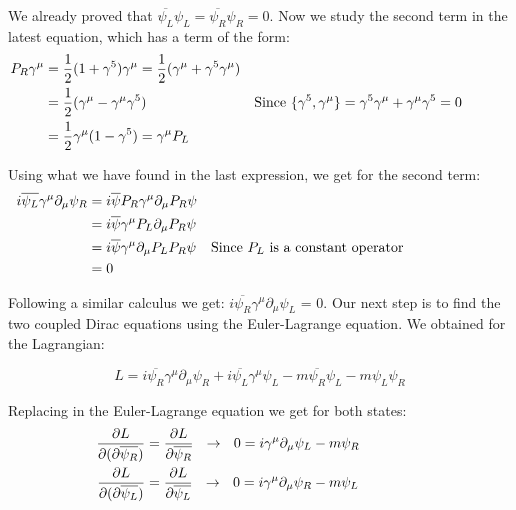 We already proved that $\overline{\psi_L}\psi_L = \overline{\psi_R}\psi_R = 0$. Now we study the second term in the latest equation, which has a term of the form:
\begin{align}
  &\begin{aligned}
     \mathllap{P_R\gamma^\mu}  &= \frac{1}{2} (1 + \gamma^5)\gamma^\mu = \frac{1}{2} (\gamma^\mu + \gamma^5 \gamma^\mu) \\        
     \mathllap{}            &= \frac{1}{2} (\gamma^\mu - \gamma^\mu \gamma^5) & \text{Since $\{\gamma^5,\gamma^\mu\} = \gamma^5\gamma^\mu + \gamma^\mu \gamma^5 = 0$} \\
     \mathllap{}            &= \frac{1}{2} \gamma^\mu (1 - \gamma^5) = \gamma^\mu P_L 
  &\end{aligned}
\end{align}

Using what we have found in the last expression, we get for the second term:
\begin{align*}
  &\begin{aligned}
     \mathllap{i\overline{\psi_L}\gamma^\mu \partial_\mu \psi_R}  &=  i \overline{\psi}P_R \gamma^\mu \partial_\mu P_R \psi\\        
     \mathllap{}            &=  i \overline{\psi}\gamma^\mu P_L \partial_\mu P_R\psi \\
     \mathllap{}            &=  i \overline{\psi}\gamma^\mu \partial_\mu P_L P_R \psi && \text{Since $P_L$ is a constant operator}\\
     \mathllap{}            &=  0
  &\end{aligned}
\end{align*}

Following a similar calculus we get: $i\overline{\psi_R}\gamma^\mu \partial_\mu \psi_L$ = 0. Our next step is to find the two coupled Dirac equations using the Euler-Lagrange equation. We obtained for the Lagrangian:

\begin{equation}
L = i \overline{\psi_R} \gamma^\mu \partial_\mu \psi_R + i \overline{\psi_L}\gamma^\mu \psi_L -m\overline{\psi_R}\psi_L - m \psi_L\psi_R
\end{equation}

Replacing in the Euler-Lagrange equation we get for both states:
\begin{align*}
  &\begin{aligned}
     \mathllap{\frac{\partial L}{\partial(\partial \overline{\psi_R})}}  &=  \frac{\partial L}{\partial \overline{\psi_R}} \ \ \rightarrow \ \ 0 = i \gamma^\mu \partial_\mu \psi_L -m \psi_R  \\        
     \mathllap{\frac{\partial L}{\partial(\partial \overline{\psi_L})}}  &=  \frac{\partial L}{\partial \overline{\psi_L}} \ \ \rightarrow \ \ 0 = i \gamma^\mu \partial_\mu \psi_R -m \psi_L\\ 
  &\end{aligned} \label{major start}
\end{align*}

